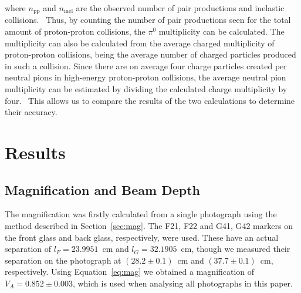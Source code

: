 \documentclass[twocolumn]{article}
\begin{document}
where $n_{\text{pp}}$ and $n_{\text{inel}}$ are the observed number of pair productions and inelastic collisions.~\cite{seul} Thus, by counting the number of pair productions seen for the total amount of proton-proton collisions, the $\pi^0$ multiplicity can be calculated. The multiplicity can also be calculated from the average charged multiplicity of proton-proton collisions, being the average number of charged particles produced in such a collision. Since there are on average four charge particles created per neutral pions in high-energy proton-proton collisions, the average neutral pion multiplicity can be estimated by dividing the calculated charge multiplicity by four.~\cite{Fernow} This allows us to compare the results of the two calculations to determine their accuracy.

\section{Results} \label{sec:res}
\subsection{Magnification and Beam Depth}
The magnification was firstly calculated from a single photograph using the method described in Section~\ref{sec:mag}. The F21, F22 and G41, G42 markers on the front glass and back glass, respectively, were used. These have an actual separation of $l_F = 23.9951$~cm and $l_G = 32.1905$~cm, though we measured their separation on the photograph at $(28.2 \pm 0.1)$~cm and $(37.7 \pm 0.1)$~cm, respectively. Using Equation~\ref{eq:mag} we obtained a magnification of $V_A = 0.852 \pm 0.003$, which is used when analysing all photographs in this paper. \\
\end{document}
